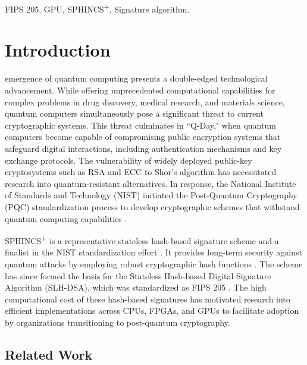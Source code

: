 \documentclass[journal]{IEEEtran}
\begin{document}
\begin{IEEEkeywords}
  FIPS 205, GPU, SPHINCS\textsuperscript{+}, Signature algorithm.
\end{IEEEkeywords}

\color{blue}

\section{Introduction}
\label{sec:intro}


 emergence of quantum computing presents a double-edged technological advancement. While offering unprecedented computational capabilities for complex problems in drug discovery, medical research, and materials science, quantum computers simultaneously pose a significant threat to current cryptographic systems. This threat culminates in ``Q-Day," when quantum computers become capable of compromising public encryption systems that safeguard digital interactions, including authentication mechanisms and key exchange protocols. The vulnerability of widely deployed public-key cryptosystems such as RSA and ECC to Shor's algorithm \cite{Shor1994} has necessitated research into quantum-resistant alternatives. In response, the National Institute of Standards and Technology (NIST) initiated the Post-Quantum Cryptography (PQC) standardization process to develop cryptographic schemes that withstand quantum computing capabilities \cite{NIST2016}.

SPHINCS\textsuperscript{+} is a representative stateless hash-based signature scheme and a finalist in the NIST standardization effort \cite{Turan}. It provides long-term security against quantum attacks by employing robust cryptographic hash functions \cite{Bernstein2019}. The scheme has since formed the basis for the Stateless Hash-based Digital Signature Algorithm (SLH-DSA), which was standardized as FIPS 205 \cite{FIPS205}. The high computational cost of these hash-based signatures has motivated research into efficient implementations across CPUs, FPGAs, and GPUs \cite{Joseph2022} to facilitate adoption by organizations transitioning to post-quantum cryptography.

\subsection{Related Work}
\end{document}
